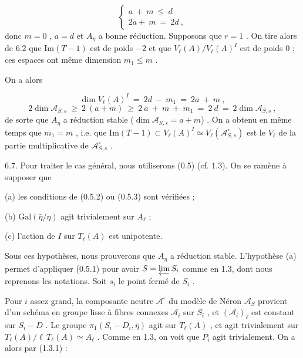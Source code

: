 \begin{equation*}
\left\{
\begin{array}{l}
a \ + \ m \ \leqslant \ d \\[2ex]
2a + \ m \ = \ 2d \ ,
\end{array}
\right.
\end{equation*}
donc $m = 0$ , $a = d$ et $A_{\eta}$ a bonne réduction. Supposons que $r = 1$ . On tire alors de 6.2 que $\mathrm{Im}(T-1)$ est de poids $-2$ et que $V_{\ell}(A)/V_{\ell}(A)^{I}$ est de poids 0 ; ces espaces ont même dimension $m_{1} \leqslant m$ .

On a alors

\begin{equation*}
\dim V_{\ell}(A)^{I} \ = \ 2d \ - \ m_{1} \ = \ 2a \ + \ m \ ,
\end{equation*}
\begin{equation*}
2 \dim \mathcal{A}_{S,s} \ \geqslant \ 2 \ (a + m) \ \geqslant \ 2 \ a \ + \ m \ + \ m_{1} \ = \ 2 \ d \ = \ 2 \dim \mathcal{A}_{S,s} \ ,
\end{equation*}
de sorte que $A_{\eta}$ a réduction stable ($\dim \mathcal{A}_{S,s} = a + m$) . On a obtenu en même temps que $m_{1} = m$ , i.e. que $\mathrm{Im}(T-1) \subset V_{\ell}(A)^{I} \simeq V_{\ell}(\mathcal{A}^{\circ}_{S,s})$ est le $V_{\ell}$ de la partie multiplicative de $\mathcal{A}^{\circ}_{S,s}$ .

6.7. Pour traiter le cas général, nous utiliserons (0.5) (cf. 1.3). On se ramène à supposer que



(a) les conditions de (0.5.2) ou (0.5.3)  sont vérifiées ;

(b) $\mathrm{Gal}(\bar{\eta}/\eta)$  agit trivialement sur  $A_\ell$ ;

(c) l'action de  $I$  sur  $T_\ell(A)$  est unipotente.

Sous ces hypothèses, nous prouverons que  $A_\eta$  a réduction stable. L'hypothèse (a) permet d'appliquer (0.5.1) pour avoir  $S = \varprojlim S_i$  comme en 1.3, dont nous reprenons les notations. Soit  $s_i$  le point fermé de  $S_i$ .

Pour  $i$  assez grand, la composante neutre  $\mathcal{A}^\circ$  du modèle de Néron  $\mathcal{A}_S$  provient d'un schéma en groupe lisse à fibres connexes  $\mathcal{A}_i$  sur  $S_i$ , et  $(\mathcal{A}_i)_\ell$  est constant sur  $S_i - D$ . Le groupe  $\pi_1(S_i - D_i , \bar{\eta})$  agit sur  $T_\ell(A)$ , et agit trivialement sur  $T_\ell(A)/\ell\, T_\ell(A) \simeq A_\ell$ . Comme en 1.3, on voit que  $P_i$  agit trivialement. On a alors par (1.3.1) :

